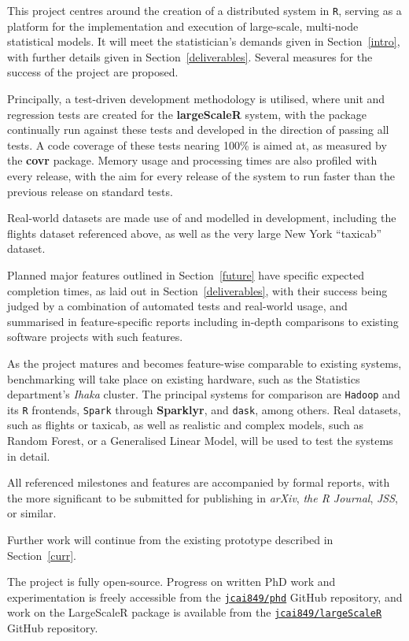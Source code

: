 This project centres around the creation of a distributed system in \texttt{R}, serving as a platform for the implementation and execution of large-scale, multi-node statistical models.
It will meet the statistician's demands given in Section~\ref{intro}, with further details given in Section~\ref{deliverables}.
Several measures for the success of the project are proposed.

Principally, a test-driven development methodology is utilised, where unit and regression tests are created for the \textbf{largeScaleR} system, with the package continually run against these tests and developed in the direction of passing all tests.
A code coverage of these tests nearing 100\% is aimed at, as measured by the \textbf{covr} package.
Memory usage and processing times are also profiled with every release, with the aim for every release of the system to run faster than the previous release on standard tests.

Real-world datasets are made use of and modelled in development, including the flights dataset referenced above, as well as the very large New York ``taxicab'' dataset\cite{tlc2021trips}.

Planned major features outlined in Section~\ref{future} have specific expected completion times, as laid out in Section~\ref{deliverables}, with their success being judged by a combination of automated tests and real-world usage, and summarised in feature-specific reports including in-depth comparisons to existing software projects with such features.

As the project matures and becomes feature-wise comparable to existing systems, benchmarking will take place on existing hardware, such as the Statistics department's \textit{Ihaka} cluster. 
The principal systems for comparison are \texttt{Hadoop} and its \texttt{R} frontends, \texttt{Spark} through \textbf{Sparklyr}, and \texttt{dask}, among others.
Real datasets, such as flights or taxicab, as well as realistic and complex models, such as Random Forest, or a Generalised Linear Model, will be used to test the systems in detail.

All referenced milestones and features are accompanied by formal reports, with the more significant to be submitted for publishing in \textit{arXiv}, \textit{the R Journal}, \textit{JSS}, or similar.

Further work will continue from the existing prototype described in Section~\ref{curr}.

The project is fully open-source.
Progress on written PhD work and experimentation is freely accessible from the \href{https://github.com/jcai849/phd}{\texttt{jcai849/phd}} GitHub repository, and work on the LargeScaleR package is available from the \href{https://github.com/jcai849/phd}{\texttt{jcai849/largeScaleR}} GitHub repository\cite{cairns2020largescaler}.
